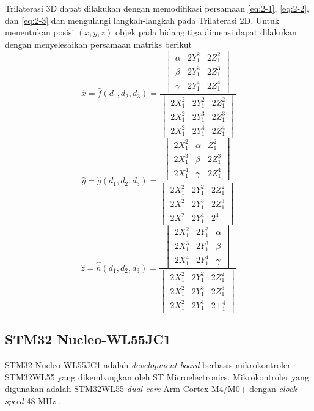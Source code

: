 Trilaterasi 3D dapat dilakukan dengan memodifikasi persamaan \ref{eq:2-1}, \ref{eq:2-2}, dan \ref{eq:2-3} dan mengulangi langkah-langkah pada Trilaterasi 2D. Untuk menentukan posisi $\left(x,y,z\right)$ objek pada bidang tiga dimensi dapat dilakukan dengan menyelesaikan persamaan matriks berikut
$$
\hat{x}=\hat{f}\left(d_1,d_2,d_3\right)=\frac{
	\begin{vmatrix}
		\alpha & 2Y_1^2 & 2Z_1^2\\
		\beta & 2Y_1^3 & 2Z_1^3\\
		\gamma & 2Y_1^4 & 2Z_1^4
\end{vmatrix}}
{
	\begin{vmatrix}
		2X_1^2 & 2Y_1^2 & 2Z_1^2\\
		2X_1^2 & 2Y_1^3 & 2Z_1^3\\
		2X_1^2 & 2Y_1^4 & 2Z_1^4
	\end{vmatrix}
}
$$
$$
\hat{y}=\hat{g}\left(d_1,d_2,d_3\right)=\frac{
	\begin{vmatrix}
		2X_1^2 & \alpha & Z_1^2\\
		2X_1^3 & \beta & 2Z_1^3\\
		2X_1^4 & \gamma & 2Z_1^4
	\end{vmatrix}
}
{
	\begin{vmatrix}
		2X_1^2 & 2Y_1^2 & 2Z_1^2\\
		2X_1^2 & 2Y_1^3 & 2Z_1^3\\
		2X_1^2 & 2Y_1^4 & 2_1^4
	\end{vmatrix}
}
$$
$$\hat{z}=\hat{h}\left(d_1,d_2,d_3\right)=\frac{
	\begin{vmatrix}
		2X_1^2 & 2Y_1^2 & \alpha\\
		2X_1^3 & 2Y_1^3  & \beta\\
		2X_1^4 & 2Y_1^4 & \gamma
\end{vmatrix}}
{
	\begin{vmatrix}
		2X_1^2 & 2Y_1^2 & 2Z_1^2\\
		2X_1^2 & 2Y_1^3 & 2Z_1^3\\
		2X_1^2 & 2Y_1^4 & 2+_1^4
	\end{vmatrix}
}
$$

\subsection{STM32 Nucleo-WL55JC1}
STM32 Nucleo-WL55JC1 adalah \textit{development board} berbasis mikrokontroler STM32WL55 yang  dikembangkan oleh ST Microelectronics. Mikrokontroler yang digunakan adalah STM32WL55  \textit{dual-core }Arm Cortex-M4/M0+ dengan \textit{clock speed} 48 MHz \cite{STMicroelectronics2022a}.

